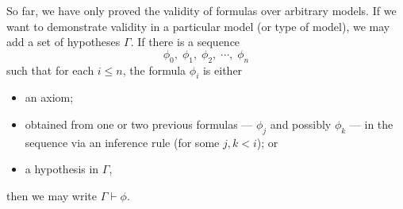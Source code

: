 So far, we have only proved the validity of formulas over arbitrary models. If we want to demonstrate validity in a particular model (or type of model), we may add a set of hypotheses \(\Gamma\). If there is a sequence
%
\[\phi_0,\; \phi_1,\; \phi_2,\; \cdots,\; \phi_n\]
%
such that for each \(i \leq n\), the formula \(\phi_i\) is either
%
\begin{itemize}
    \item an axiom;
    \item obtained from one or two previous formulas --- \(\phi_j\) and possibly \(\phi_k\) --- in the sequence via an inference rule (for some \(j, k < i\)); or
    \item a hypothesis in \(\Gamma\),
\end{itemize}
%
then we may write \(\Gamma\vdash\phi\).

